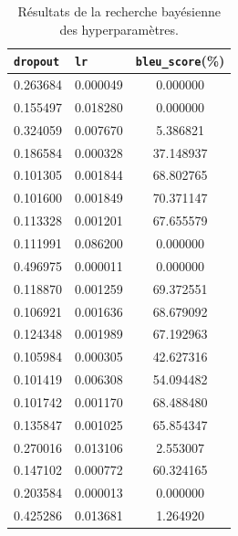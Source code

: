 \begin{table}[htb]
    \begin{center}
        \begin{tabular}{llc}
            \toprule
            \verb|dropout| & \verb|lr| & \verb|bleu_score|(\%) \\
            \midrule
            0.263684       & 0.000049 &        0.000000        \\
            0.155497       & 0.018280 &        0.000000        \\
            0.324059       & 0.007670 &        5.386821        \\
            0.186584       & 0.000328 &       37.148937        \\
            0.101305       & 0.001844 &       68.802765        \\
            0.101600       & 0.001849 &       70.371147        \\
            0.113328       & 0.001201 &       67.655579        \\
            0.111991       & 0.086200 &        0.000000        \\
            0.496975       & 0.000011 &        0.000000        \\
            0.118870       & 0.001259 &       69.372551        \\
            0.106921       & 0.001636 &       68.679092        \\
            0.124348       & 0.001989 &       67.192963        \\
            0.105984       & 0.000305 &       42.627316        \\
            0.101419       & 0.006308 &       54.094482        \\
            0.101742       & 0.001170 &       68.488480        \\
            0.135847       & 0.001025 &       65.854347        \\
            0.270016       & 0.013106 &        2.553007        \\
            0.147102       & 0.000772 &       60.324165        \\
            0.203584       & 0.000013 &        0.000000        \\
            0.425286       & 0.013681 &        1.264920        \\
            \bottomrule
        \end{tabular}
    \end{center}
    \caption{Résultats de la recherche bayésienne des hyperparamètres.}%
    \label{tab.results.hparams}
\end{table}

